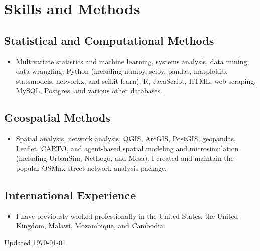 \documentclass{academiccv}
\begin{document}
\section*{Skills and Methods}

\subsection*{Statistical and Computational Methods}

\begin{itemize}
	\item Multivariate statistics and machine learning, systems analysis, data mining, data wrangling, Python (including numpy, scipy, pandas, matplotlib, statsmodels, networkx, and scikit-learn), R, JavaScript, HTML, web scraping, MySQL, Postgres, and various other databases.
\end{itemize}

\subsection*{Geospatial Methods}

\begin{itemize}
	\item Spatial analysis, network analysis, QGIS, ArcGIS, PostGIS, geopandas, Leaflet, CARTO, and agent-based spatial modeling and microsimulation (including UrbanSim, NetLogo, and Mesa). I created and maintain the popular OSMnx street network analysis package.
\end{itemize}

\subsection*{International Experience}

\begin{itemize}
	\item I have previously worked professionally in the United States, the United Kingdom, Malawi, Mozambique, and Cambodia.
\end{itemize}



\begin{center}
\vspace{6em}
Updated \monthyeardate\today
\end{center}
\end{document}
